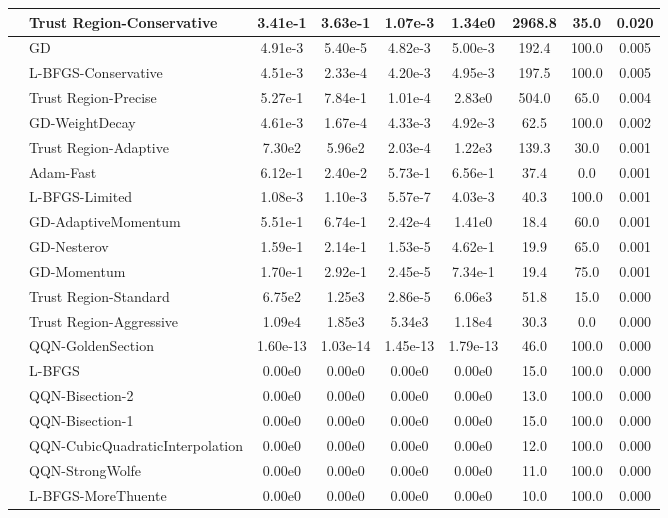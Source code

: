 \documentclass[10pt]{article}
\begin{document}
\begin{longtable}{|l|l|c|c|c|c|c|c|c|}
\hline
 & Trust Region-Conservative & 3.41e-1 & 3.63e-1 & 1.07e-3 & 1.34e0 & 2968.8 & 35.0 & 0.020 \\
\hline
 & GD & 4.91e-3 & 5.40e-5 & 4.82e-3 & 5.00e-3 & 192.4 & 100.0 & 0.005 \\
\hline
 & L-BFGS-Conservative & 4.51e-3 & 2.33e-4 & 4.20e-3 & 4.95e-3 & 197.5 & 100.0 & 0.005 \\
\hline
 & Trust Region-Precise & 5.27e-1 & 7.84e-1 & 1.01e-4 & 2.83e0 & 504.0 & 65.0 & 0.004 \\
\hline
 & GD-WeightDecay & 4.61e-3 & 1.67e-4 & 4.33e-3 & 4.92e-3 & 62.5 & 100.0 & 0.002 \\
\hline
 & Trust Region-Adaptive & 7.30e2 & 5.96e2 & 2.03e-4 & 1.22e3 & 139.3 & 30.0 & 0.001 \\
\hline
 & Adam-Fast & 6.12e-1 & 2.40e-2 & 5.73e-1 & 6.56e-1 & 37.4 & 0.0 & 0.001 \\
\hline
 & L-BFGS-Limited & 1.08e-3 & 1.10e-3 & 5.57e-7 & 4.03e-3 & 40.3 & 100.0 & 0.001 \\
\hline
 & GD-AdaptiveMomentum & 5.51e-1 & 6.74e-1 & 2.42e-4 & 1.41e0 & 18.4 & 60.0 & 0.001 \\
\hline
 & GD-Nesterov & 1.59e-1 & 2.14e-1 & 1.53e-5 & 4.62e-1 & 19.9 & 65.0 & 0.001 \\
\hline
 & GD-Momentum & 1.70e-1 & 2.92e-1 & 2.45e-5 & 7.34e-1 & 19.4 & 75.0 & 0.001 \\
\hline
 & Trust Region-Standard & 6.75e2 & 1.25e3 & 2.86e-5 & 6.06e3 & 51.8 & 15.0 & 0.000 \\
\hline
 & Trust Region-Aggressive & 1.09e4 & 1.85e3 & 5.34e3 & 1.18e4 & 30.3 & 0.0 & 0.000 \\
\hline
 & QQN-GoldenSection & 1.60e-13 & 1.03e-14 & 1.45e-13 & 1.79e-13 & 46.0 & 100.0 & 0.000 \\
\hline
 & L-BFGS & 0.00e0 & 0.00e0 & 0.00e0 & 0.00e0 & 15.0 & 100.0 & 0.000 \\
\hline
 & QQN-Bisection-2 & 0.00e0 & 0.00e0 & 0.00e0 & 0.00e0 & 13.0 & 100.0 & 0.000 \\
\hline
 & QQN-Bisection-1 & 0.00e0 & 0.00e0 & 0.00e0 & 0.00e0 & 15.0 & 100.0 & 0.000 \\
\hline
 & QQN-CubicQuadraticInterpolation & 0.00e0 & 0.00e0 & 0.00e0 & 0.00e0 & 12.0 & 100.0 & 0.000 \\
\hline
 & QQN-StrongWolfe & 0.00e0 & 0.00e0 & 0.00e0 & 0.00e0 & 11.0 & 100.0 & 0.000 \\
\hline
 & L-BFGS-MoreThuente & 0.00e0 & 0.00e0 & 0.00e0 & 0.00e0 & 10.0 & 100.0 & 0.000 \\

\end{longtable}
\end{document}
